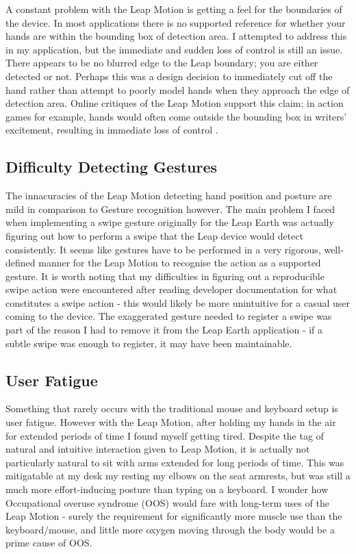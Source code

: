 \documentclass{sigplanconf}
\begin{document}
A constant problem with the Leap Motion is getting a feel for the boundaries of the device. In most applications there is no supported reference for whether your hands are within the bounding box of detection area. I attempted to address this in my application, but the immediate and sudden loss of control is still an issue. There appears to be no blurred edge to the Leap boundary; you are either detected or not. Perhaps this was a design decision to immediately cut off the hand rather than attempt to poorly model hands when they approach the edge of detection area. Online critiques of the Leap Motion support this claim; in action games for example, hands would often come outside the bounding box in writers' excitement, resulting in immediate loss of control \cite{leap_review}. 

\subsection{Difficulty Detecting Gestures}

The innacuracies of the Leap Motion detecting hand position and posture are mild in comparison to Gesture recognition however. The main problem I faced when implementing a swipe gesture originally for the Leap Earth was actually figuring out how to perform a swipe that the Leap device would detect consistently. It seems like gestures have to be performed in a very rigorous, well-defined manner for the Leap Motion to recognise the action as a supported gesture. It is worth noting that my difficulties in figuring out a reproducible swipe action were encountered after reading developer documentation for what constitutes a swipe action - this would likely be more unintuitive for a casual user coming to the device. The exaggerated gesture needed to register a swipe was part of the reason I had to remove it from the Leap Earth application - if a subtle swipe was enough to register, it may have been maintainable.

\subsection{User Fatigue}

Something that rarely occurs with the traditional mouse and keyboard setup is user fatigue. However with the Leap Motion, after holding my hands in the air for extended periods of time I found myself getting tired. Despite the tag of natural and intuitive interaction given to Leap Motion, it is actually not particularly natural to sit with arms extended for long periods of time. This was mitigatable at my desk my resting my elbows on the seat armrests, but was still a much more effort-inducing posture than typing on a keyboard. I wonder how Occupational overuse syndrome (OOS) would fare with long-term uses of the Leap Motion - surely the requirement for significantly more muscle use than the keyboard/mouse, and little more oxygen moving through the body would be a prime cause of OOS.
\end{document}
